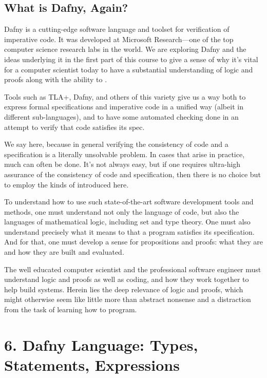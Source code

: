 \documentclass[letterpaper,10pt,english]{sphinxmanual}
\begin{document}
\section{What is Dafny, Again?}
\label{\detokenize{05-verifying-logical-specifications:what-is-dafny-again}}
Dafny is a cutting-edge software language and toolset for verification
of imperative code. It was developed at Microsoft Research—one of
the top computer science research labs in the world. We are exploring
Dafny and the ideas underlying it in the first part of this course to
give a sense of why it’s vital for a computer scientist today to have
a substantial understanding of logic and proofs along with the ability
to .

Tools such as TLA+, Dafny, and others of this variety give us a way
both to express formal specifications and imperative code in a unified
way (albeit in different sub-languages), and to have some automated
checking done in an attempt to verify that code satisfies its spec.

We say  here, because in general verifying the consistency of
code and a specification is a literally unsolvable problem. In cases
that arise in practice, much can often be done. It’s not always easy,
but if one requires ultra-high assurance of the consistency of code
and specification, then there is no choice but to employ the kinds of
 introduced here.

To understand how to use such state-of-the-art software development
tools and methods, one must understand not only the language of code,
but also the languages of mathematical logic, including set and type
theory. One must also understand precisely what it means to 
that a program satisfies its specification. And for that, one must
develop a sense for propositions and proofs: what they are and how
they are built and evaluated.

The well educated computer scientist and the professional software
engineer must understand logic and proofs as well as coding, and how
they work together to help build  systems. Herein lies
the deep relevance of logic and proofs, which might otherwise seem
like little more than abstract nonsense and a distraction from the
task of learning how to program.


\chapter{6. Dafny Language: Types, Statements, Expressions}
\label{\detokenize{06-dafny-language::doc}}\label{\detokenize{06-dafny-language:dafny-language-types-statements-expressions}}
\end{document}
